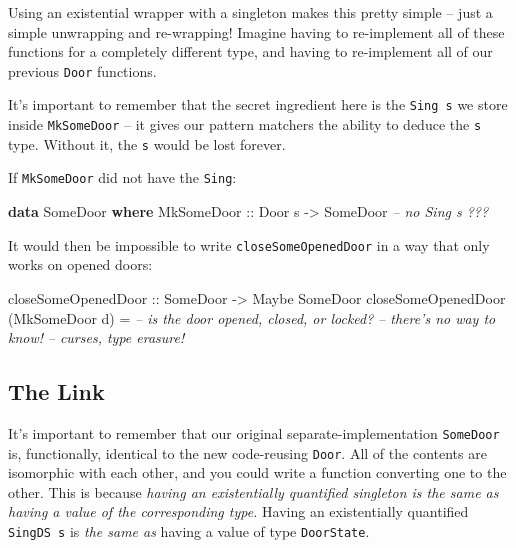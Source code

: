 \documentclass[]{article}
\newenvironment{Shaded}{}{}
\newcommand{\CommentTok}[1]{\textcolor[rgb]{0.38,0.63,0.69}{\textit{#1}}}
\newcommand{\DataTypeTok}[1]{\textcolor[rgb]{0.56,0.13,0.00}{#1}}
\newcommand{\KeywordTok}[1]{\textcolor[rgb]{0.00,0.44,0.13}{\textbf{#1}}}
\newcommand{\NormalTok}[1]{#1}
\newcommand{\OtherTok}[1]{\textcolor[rgb]{0.00,0.44,0.13}{#1}}
\begin{document}
Using an existential wrapper with a singleton makes this pretty simple -- just a
simple unwrapping and re-wrapping! Imagine having to re-implement all of these
functions for a completely different type, and having to re-implement all of our
previous \texttt{Door} functions.

It's important to remember that the secret ingredient here is the
\texttt{Sing\ s} we store inside \texttt{MkSomeDoor} -- it gives our pattern
matchers the ability to deduce the \texttt{s} type. Without it, the \texttt{s}
would be lost forever.

If \texttt{MkSomeDoor} did not have the \texttt{Sing}:

\begin{Shaded}
\begin{Highlighting}[]
\KeywordTok{data} \DataTypeTok{SomeDoor} \KeywordTok{where}
    \DataTypeTok{MkSomeDoor}\OtherTok{  ::} \DataTypeTok{Door}\NormalTok{ s }\OtherTok{->} \DataTypeTok{SomeDoor}       \CommentTok{-- no Sing s ???}
\end{Highlighting}
\end{Shaded}

It would then be impossible to write \texttt{closeSomeOpenedDoor} in a way that
only works on opened doors:

\begin{Shaded}
\begin{Highlighting}[]
\OtherTok{closeSomeOpenedDoor ::} \DataTypeTok{SomeDoor} \OtherTok{->} \DataTypeTok{Maybe} \DataTypeTok{SomeDoor}
\NormalTok{closeSomeOpenedDoor (}\DataTypeTok{MkSomeDoor}\NormalTok{ d) }\OtherTok{=}
            \CommentTok{-- is the door opened, closed, or locked?}
            \CommentTok{-- there's no way to know!}
            \CommentTok{-- curses, type erasure!}
\end{Highlighting}
\end{Shaded}

\hypertarget{the-link}{%
\subsection{The Link}\label{the-link}}

It's important to remember that our original separate-implementation
\texttt{SomeDoor} is, functionally, identical to the new code-reusing
\texttt{Door}. All of the contents are isomorphic with each other, and you could
write a function converting one to the other. This is because \emph{having an
existentially quantified singleton is the same as having a value of the
corresponding type.} Having an existentially quantified \texttt{SingDS\ s} is
\emph{the same as} having a value of type \texttt{DoorState}.
\end{document}
